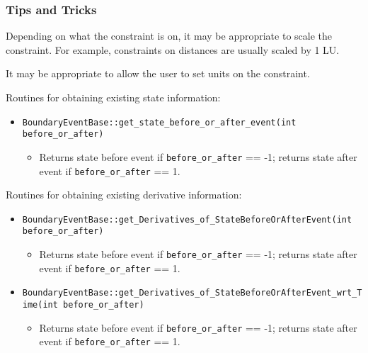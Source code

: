 \documentclass[11pt]{article}
\begin{document}
\subsubsection{Tips and Tricks}
\label{sec:CreatingConstraintTipsAndTricks}

Depending on what the constraint is on, it may be appropriate to scale the constraint. For example, constraints on distances are usually scaled by 1 LU.

It may be appropriate to allow the user to set units on the constraint.

Routines for obtaining existing state information:

\begin{itemize}
	\item \texttt{BoundaryEventBase::get\_state\_before\_or\_after\_event(int before\_or\_after)}
	\begin{itemize}
		\item Returns state before event if \texttt{before\_or\_after} == -1; returns state after event if \texttt{before\_or\_after} == 1.
	\end{itemize}
\end{itemize}

Routines for obtaining existing derivative information:

\begin{itemize}
	\item \texttt{BoundaryEventBase::get\_Derivatives\_of\_StateBeforeOrAfterEvent(int before\_or\_after)}
	\begin{itemize}
		\item Returns state before event if \texttt{before\_or\_after} == -1; returns state after event if \texttt{before\_or\_after} == 1.
	\end{itemize}
	\item \texttt{BoundaryEventBase::get\_Derivatives\_of\_StateBeforeOrAfterEvent\_wrt\_Time(int before\_or\_after)}
	\begin{itemize}
		\item Returns state before event if \texttt{before\_or\_after} == -1; returns state after event if \texttt{before\_or\_after} == 1.
	\end{itemize}
\end{itemize}
\end{document}
